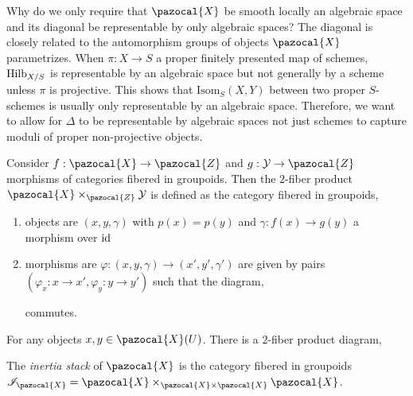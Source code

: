 \documentclass[12pt]{article}
\renewcommand{\X}{\pazocal{X}}
\newcommand{\Y}{\mathcal{Y}}
\newcommand{\cZ}{\pazocal{Z}}
\begin{document}
\begin{rmk}
Why do we only require that $\X$ be smooth locally an algebraic space and its diagonal be representable by only algebraic spaces? The diagonal is closely related to the automorphism groups of objects $\X$ parametrizes. When $\pi : X \to S$ a proper finitely presented map of schemes, $\mathrm{Hilb}_{X/S}$ is representable by an algebraic space but not generally by a scheme unless $\pi$ is projective. This shows that $\mathrm{Isom}_S(X, Y)$ between two proper $S$-schemes is usually only representable by an algebraic space. Therefore, we want to allow for $\Delta$ to be representable by algebraic spaces not just schemes to capture moduli of proper non-projective objects. 
\end{rmk}

\begin{defn}
Consider $f : \X \to \cZ$ and $g : \Y \to \cZ$ morphisms of categories fibered in groupoids. Then the $2$-fiber product $\X \times_{\cZ} \Y$ is defined as the category fibered in groupoids,
\begin{enumerate}
\item objects are $(x,y,\gamma)$ with $p(x) = p(y)$ and $\gamma : f(x) \to g(y)$ a morphism over $\mathrm{id}$
\item morphisms are $\varphi : (x,y,\gamma) \to (x',y', \gamma')$ are given by pairs $(\varphi_x : x \to x', \varphi_y : y \to y')$ such that the diagram,
\begin{center}
\end{center}
commutes.
\end{enumerate}
\end{defn}

\begin{prop}
For any objects $x,y \in \X(U)$. There is a $2$-fiber product diagram,
\begin{center}
\end{center}
\end{prop}

\begin{defn}
The \textit{inertia stack} of $\X$ is the category fibered in groupoids $\I_{\X} = \X \times_{\X \times \X} \X$.
\end{defn}
\end{document}
